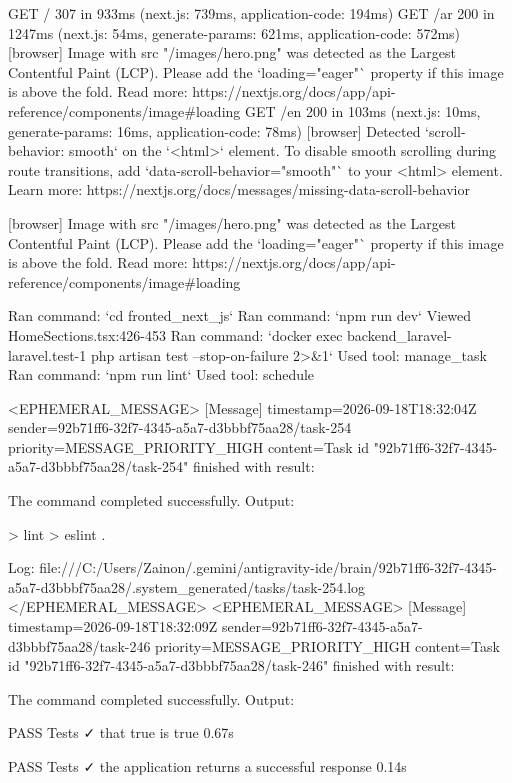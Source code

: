  GET / 307 in 933ms (next.js: 739ms, application-code: 194ms)
 GET /ar 200 in 1247ms (next.js: 54ms, generate-params: 621ms, application-code: 572ms)
[browser] Image with src "/images/hero.png" was detected as the Largest Contentful Paint (LCP). Please add the `loading="eager"` property if this image is above the fold.
Read more: https://nextjs.org/docs/app/api-reference/components/image#loading
 GET /en 200 in 103ms (next.js: 10ms, generate-params: 16ms, application-code: 78ms)
[browser] Detected `scroll-behavior: smooth` on the `<html>` element. To disable smooth scrolling during route transitions, add `data-scroll-behavior="smooth"` to your <html> element. Learn more: https://nextjs.org/docs/messages/missing-data-scroll-behavior

[browser] Image with src "/images/hero.png" was detected as the Largest Contentful Paint (LCP). Please add the `loading="eager"` property if this image is above the fold.
Read more: https://nextjs.org/docs/app/api-reference/components/image#loading

Ran command: `cd fronted_next_js`
Ran command: `npm run dev`
Viewed HomeSections.tsx:426-453
Ran command: `docker exec backend_laravel-laravel.test-1 php artisan test --stop-on-failure 2>&1`
Used tool: manage_task
Ran command: `npm run lint`
Used tool: schedule

<EPHEMERAL_MESSAGE>
[Message] timestamp=2026-09-18T18:32:04Z sender=92b71ff6-32f7-4345-a5a7-d3bbbf75aa28/task-254 priority=MESSAGE_PRIORITY_HIGH content=Task id "92b71ff6-32f7-4345-a5a7-d3bbbf75aa28/task-254" finished with result:

				The command completed successfully.
				Output:
				
> lint
> eslint .

Log: file:///C:/Users/Zainon/.gemini/antigravity-ide/brain/92b71ff6-32f7-4345-a5a7-d3bbbf75aa28/.system_generated/tasks/task-254.log
</EPHEMERAL_MESSAGE>
<EPHEMERAL_MESSAGE>
[Message] timestamp=2026-09-18T18:32:09Z sender=92b71ff6-32f7-4345-a5a7-d3bbbf75aa28/task-246 priority=MESSAGE_PRIORITY_HIGH content=Task id "92b71ff6-32f7-4345-a5a7-d3bbbf75aa28/task-246" finished with result:

				The command completed successfully.
				Output:
				
   PASS  Tests\Unit\ExampleTest
  ✓ that true is true                                                    0.67s  

   PASS  Tests\Feature\ExampleTest
  ✓ the application returns a successful response                        0.14s  

